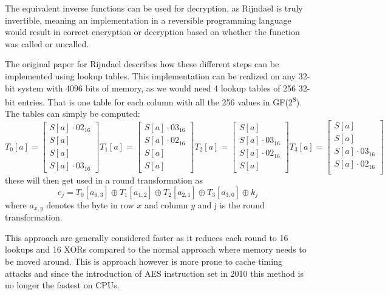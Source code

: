 \documentclass[a4paper, openany]{book}
\begin{document}
The equivalent inverse functions can be used for decryption, as Rijndael is truly invertible, meaning an implementation in a reversible programming language would result in correct encryption or decryption based on whether the function was called or uncalled.

The original paper for Rijndael\cite{Rijndael} describes how these different steps can be implemented using lookup tables. This implementation can be realized on any 32-bit system with 4096 bits of memory, as we would need 4 lookup tables of 256 32-bit entries. That is one table for each column with all the 256 values in GF(2\textsuperscript{8}). The tables can simply be computed:
\begin{equation}
T_0[a] = \begin{bmatrix}
          S[a] \cdot 02_{16}\\
          S[a]\\
          S[a]\\
          S[a] \cdot 03_{16}
\end{bmatrix}
T_1[a] = \begin{bmatrix}
          S[a] \cdot 03_{16}\\
          S[a] \cdot 02_{16}\\
          S[a]\\
          S[a]
\end{bmatrix}
T_2[a] = \begin{bmatrix}
          S[a]\\
          S[a] \cdot 03_{16}\\
          S[a] \cdot 02_{16}\\
          S[a]
\end{bmatrix}
T_3[a] = \begin{bmatrix}
          S[a]\\
          S[a]\\
          S[a] \cdot 03_{16}\\
          S[a] \cdot 02_{16}\\
\end{bmatrix}
\end{equation}
these will then get used in a round transformation as
\begin{equation}
e_j = T_0 [a_{0,3}] \oplus T_1 [a_{1,2}] \oplus T_2 [a_{2,1}] \oplus T_3 [a_{3,0}] \oplus k_j
\end{equation}
where \(a_{x,y}\) denotes the byte in row \(x\) and column \(y\) and j is the round transformation.

This approach are generally considered faster as it reduces each round to 16 lookups and 16 XORs compared to the normal approach where memory needs to be moved around. This is approach however is more prone to cache timing attacks and since the introduction of AES instruction set in 2010 this method is no longer the fastest on CPUs.
\end{document}
